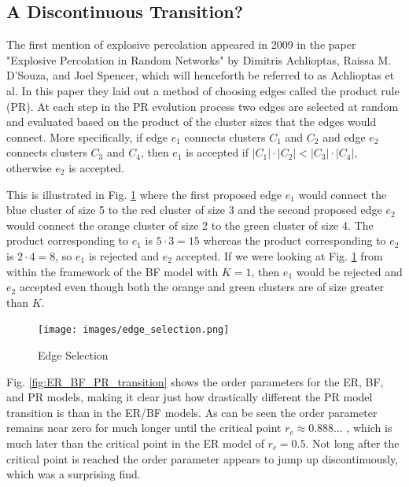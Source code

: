 \subsection{A Discontinuous Transition?}
The first mention of explosive percolation appeared in 2009 in the paper "Explosive Percolation in Random Networks" \cite{Achlioptas} by Dimitris Achlioptas, Raissa M. D’Souza, and Joel Spencer, which will henceforth be referred to as Achlioptas et al.
In this paper they laid out a method of choosing edges called the product rule (PR).
At each step in the PR evolution process two edges are selected at random and evaluated based on the product of the cluster sizes that the edges would connect.
More specifically, if edge $e_1$ connects clusters $C_1$ and $C_2$ and edge $e_2$ connects clusters $C_3$ and $C_4$, then $e_1$ is accepted if $|C_1| \cdot |C_2| < |C_3| \cdot |C_4|$, otherwise $e_2$ is accepted.

This is illustrated in Fig. \ref{fig:edge_selection} where the first proposed edge $e_1$ would connect the blue cluster of size 5 to the red cluster of size 3 and the second proposed edge $e_2$ would connect the orange cluster of size 2 to the green cluster of size 4.
The product corresponding to $e_1$ is $5 \cdot 3 = 15$ whereas the product corresponding to $e_2$ is $2 \cdot 4 = 8$, so $e_1$ is rejected and $e_2$ accepted.
If we were looking at Fig. \ref{fig:edge_selection} from within the framework of the BF model with $K = 1$, then $e_1$ would be rejected and $e_2$ accepted even though both the orange and green clusters are of size greater than $K$.

\begin{figure}[H]
	\centering
	\texttt{[image: images/edge\_selection.png]}
	\caption{Edge Selection}
	\label{fig:edge_selection}
\end{figure}

Fig. \ref{fig:ER_BF_PR_transition} shows the order parameters for the ER, BF, and PR models, making it clear just how drastically different the PR model transition is than in the ER/BF models.
As can be seen the order parameter remains near zero for much longer until the critical point $r_c \approx 0.888...$ \cite{Achlioptas}, which is much later than the critical point in the ER model of $r_c = 0.5$.
Not long after the critical point is reached the order parameter appears to jump up discontinuously, which was a surprising find.

